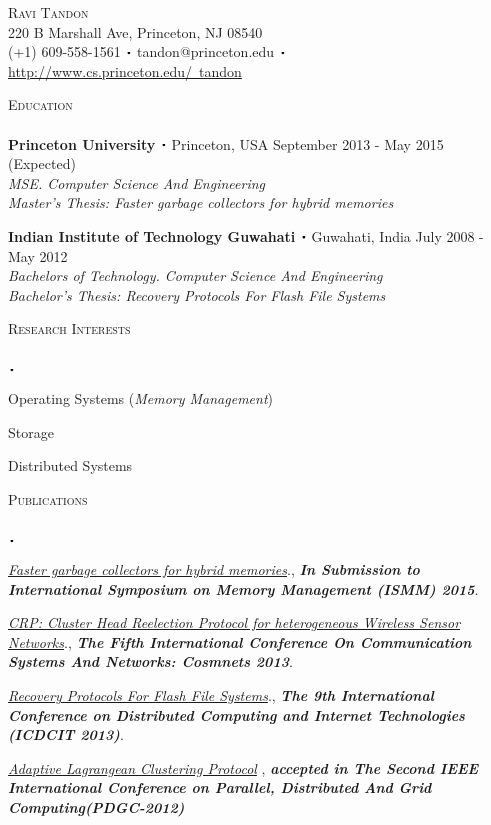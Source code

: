 \documentclass{article}
\newcommand{\sbt}{\,\begin{picture}(-1,1)(-1,-3)\circle*{2}\end{picture}\ }
\newcommand{\lineunder}{\vspace*{-8pt} \\ \hspace*{-18pt} \hrulefill \\}
\newcommand{\header}[1]{{\hspace*{-15pt}\vspace*{6pt} \textsc{#1}} \vspace*{-6pt} \lineunder}
\newcommand{\contact}[3]{
\vspace*{-18pt}
\begin{center}
{\LARGE \scshape {#1}}\\
#2 \\
#3
\end{center}
\vspace*{-8pt}
}
\newenvironment{achievements}{\begin{list}{$\sbt$}{\topsep -2pt \itemsep -2pt}}{\vspace*{0pt}\end{list}}
\newcommand{\schoolwithcourses}[5]{
 \textbf{#1} $\sbt$ #2 \hfill #3\\ 
\textit{#4} #5\\
\vspace*{1pt}
}
\begin{document}
\small
\smallskip
\vspace*{-44pt}

\contact{Ravi Tandon}
{220 B Marshall Ave, Princeton, NJ 08540}
{(+1) 609-558-1561 $\sbt$ tandon@princeton.edu  $\sbt$ \href{http://www.cs.princeton.edu/~tandon}{http://www.cs.princeton.edu/~tandon}}

\header{Education}
\schoolwithcourses{Princeton University}{Princeton, USA}{September 2013 - May 2015 (Expected)}
{\textit{MSE}. Computer Science And Engineering}{}{\textit{Master's Thesis: Faster garbage collectors for hybrid memories}}

\schoolwithcourses{Indian Institute of Technology Guwahati}{Guwahati, India}{July 2008 - May 2012}
{Bachelors of Technology. Computer Science And Engineering}{}{\textit{Bachelor's Thesis: Recovery Protocols For Flash File Systems}}


\header{Research Interests}
\begin{achievements}
 \item Operating Systems (\textit{Memory Management})
 \item Storage 
 \item Distributed Systems
\end{achievements}

\header{Publications}
\begin{achievements}
 \item \href{}{\textit{Faster garbage collectors for hybrid memories}}., {\bf{\emph{In Submission to International Symposium on Memory Management (ISMM) 2015}}}.
\item \href{http://ieeexplore.ieee.org/xpls/abs_all.jsp?arnumber=6465561&tag=1}{\textit{CRP: Cluster Head Reelection Protocol for heterogeneous Wireless Sensor Networks}}., {\bf{\emph{The Fifth International Conference On Communication Systems And Networks: Cosmnets 2013}}}.
\item \href{http://link.springer.com/chapter/10.1007\%2F978-3-642-36071-8_41#page-1}{\textit{Recovery Protocols For Flash File Systems}}., {\bf{\emph{The 9th International Conference on Distributed Computing and Internet Technologies (ICDCIT 2013)}}}.
\item \href{https://docs.google.com/file/d/0B6dV4oJpL8T8RFJXVllfd2Q0alk/edit}{\textit{Adaptive Lagrangean Clustering Protocol}} , {\bf{\emph{accepted in The Second IEEE International Conference on Parallel, Distributed And Grid Computing(PDGC-2012)}}}
\end{achievements}
\end{document}
